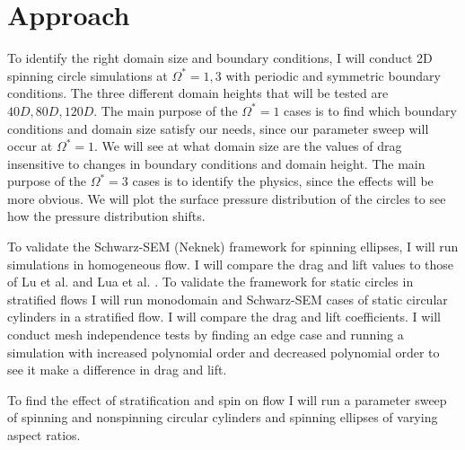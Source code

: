 \chapter{Approach}
\label{chp:Approach}
To identify the right domain size and boundary conditions, I will conduct 2D spinning circle simulations at $\Omega^{\ast} = 1, 3$ with periodic and symmetric boundary conditions. The three different domain heights that will be tested are $40D, 80D, 120D$. The main purpose of the $\Omega^{\ast}=1$ cases is to find which boundary conditions and domain size satisfy our needs, since our parameter sweep will occur at $\Omega^{\ast}=1$. We will see at what domain size are the values of drag insensitive to changes in boundary conditions and domain height. The main purpose of the $\Omega^{\ast}=3$ cases is to identify the physics, since the effects will be more obvious. We will plot the surface pressure distribution of the circles to see how the pressure distribution shifts. 

To validate the Schwarz-SEM (Neknek) framework for spinning ellipses, I will run simulations in homogeneous flow. I will compare the drag and lift values to those of Lu et al. \cite{lu_flow_2018} and Lua et al. \cite{lua_rotating_2018}. To validate the framework for static circles in stratified flows I will run monodomain and Schwarz-SEM cases of static circular cylinders in a stratified flow. I will compare the drag and lift coefficients. I will conduct mesh independence tests by finding an edge case and running a simulation with increased polynomial order and decreased polynomial order to see it make a difference in drag and lift. 

To find the effect of stratification and spin on flow I will run a parameter sweep of spinning and nonspinning circular cylinders and spinning ellipses of varying aspect ratios. 



